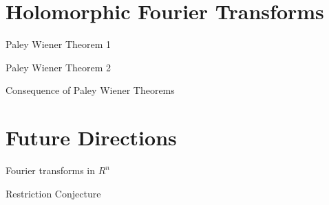 \documentclass[compress]{beamer}
\begin{document}
\section{Holomorphic Fourier Transforms}

\begin{frame}{Paley Wiener Theorem 1}
\end{frame}

\begin{frame}{Paley Wiener Theorem 2}
\end{frame}

\begin{frame}{Consequence of Paley Wiener Theorems}
\end{frame}

\section{Future Directions}

\begin{frame}{Fourier transforms in $R^n$}
\end{frame}

\begin{frame}{Restriction Conjecture}
\end{frame}
\end{document}
